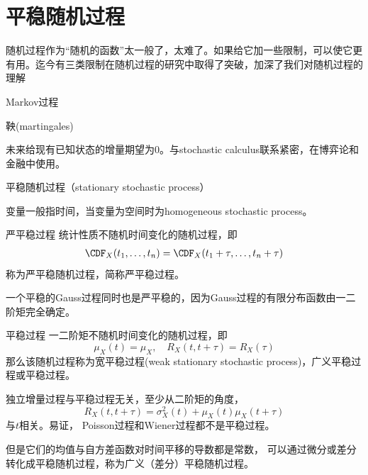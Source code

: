 \section{平稳随机过程}
随机过程作为“随机的函数”太一般了，太难了。如果给它加一些限制，可以使它更有用。迄今有三类限制在随机过程的研究中取得了突破，加深了我们对随机过程的理解
\begin{compactitem}
	\item Markov过程
	\item 鞅(martingales)
	
	未来给现有已知状态的增量期望为0。与stochastic calculus联系紧密，在博弈论和金融中使用。
	\item 平稳随机过程（stationary stochastic process）
	
	变量一般指时间，当变量为空间时为homogeneous stochastic process。
\end{compactitem}
\begin{definition}{严平稳过程}{}
	统计性质不随机时间变化的随机过程，即
	\begin{align*}
		\CDF_X(t_1,\ldots,t_n)=\CDF_X(t_1+\tau,\ldots,t_n+\tau)
	\end{align*}
	称为严平稳随机过程，简称严平稳过程。
\end{definition}
一个平稳的Gauss过程同时也是严平稳的，因为Gauss过程的有限分布函数由一二阶矩完全确定。
\begin{definition}{平稳过程}{}
	一二阶矩不随机时间变化的随机过程，即
	\begin{equation}
		\mu_X(t)=\mu_X,\quad R_X(t,t+\tau)=R_X(\tau)
	\end{equation}
	那么该随机过程称为宽平稳过程(weak stationary stochastic process)，广义平稳过程或平稳过程。
\end{definition}
独立增量过程与平稳过程无关，至少从二阶矩的角度，
\[
	R_X(t,t+\tau)=\sigma^2_X(t)+\mu_X(t)\mu_X(t+\tau)
\]
与$t$相关。易证，
Poisson过程和Wiener过程都不是平稳过程。

但是它们的均值与自方差函数对时间平移的导数都是常数，
可以通过微分或差分转化成平稳随机过程，称为广义（差分）平稳随机过程。
